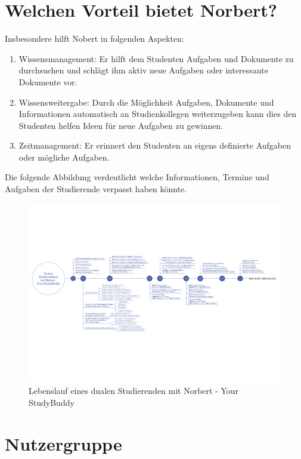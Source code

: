 \section{Welchen Vorteil bietet Norbert?}
Insbesondere hilft Nobert in folgenden Aspekten:
\begin{enumerate}
	\item Wissensmanagement: Er hilft dem Studenten Aufgaben und Dokumente zu durchsuchen und schlägt ihm aktiv neue Aufgaben oder interessante Dokumente vor.
	\item Wissensweitergabe: Durch die Möglichkeit Aufgaben, Dokumente und Informationen automatisch an Studienkollegen weiterzugeben kann dies den Studenten helfen Ideen für neue Aufgaben zu gewinnen.
	\item Zeitmanagement: Er erinnert den Studenten an eigens definierte Aufgaben oder mögliche Aufgaben.
\end{enumerate}

Die folgende Abbildung verdeutlicht welche Informationen, Termine und Aufgaben der Studierende verpasst haben könnte. 

\begin{landscape}
\vspace*{35mm}
	\begin{figure}[H]
	\centering
	\includegraphics[scale=0.75]{images/timeline.pdf}
	\caption{Lebenslauf eines dualen Studierenden mit Norbert - Your StudyBuddy}
	\end{figure}
	
\end{landscape}
\newpage

\section{Nutzergruppe}

